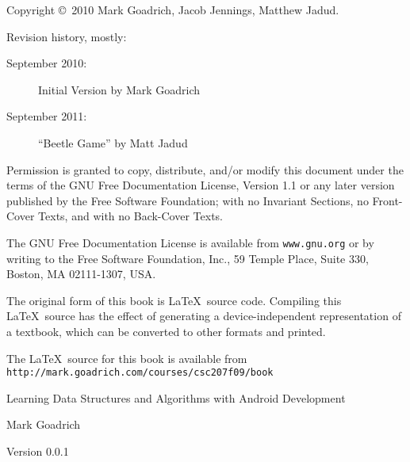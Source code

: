 \documentclass[10pt]{book}
\newcommand{\thetitle}{Learning Data Structures and Algorithms with Android Development}
\newcommand{\theversion}{0.0.1}
\begin{document}
\begin{latexonly}
\pagebreak
\thispagestyle{empty}

{\small
Copyright \copyright ~2010 Mark Goadrich, Jacob Jennings, Matthew Jadud.

Revision history, mostly:

\begin{description}

\item[September 2010:] Initial Version by Mark Goadrich
\item[September 2011:] ``Beetle Game'' by Matt Jadud

\end{description}

\vspace{0.2in}

Permission is granted to copy, distribute, and/or modify this document
under the terms of the GNU Free Documentation License, Version 1.1 or
any later version published by the Free Software Foundation; with no
Invariant Sections, no Front-Cover Texts, and with no Back-Cover Texts.

The GNU Free Documentation License is available from {\tt www.gnu.org}
or by writing to the Free Software Foundation, Inc., 59 Temple Place,
Suite 330, Boston, MA 02111-1307, USA.

The original form of this book is \LaTeX\ source code.  Compiling this
\LaTeX\ source has the effect of generating a device-independent
representation of a textbook, which can be converted to other formats
and printed.

The \LaTeX\ source for this book is available from
{\tt http://mark.goadrich.com/courses/csc207f09/book}

\vspace{0.2in}

} %

\end{latexonly}



\begin{htmlonly}


{\Huge \thetitle}

{\Large Mark Goadrich}

Version \theversion

\setcounter{chapter}{-1}

\end{htmlonly}
\end{document}
